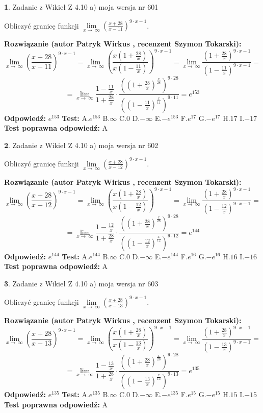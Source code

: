 \documentclass[12pt, a4paper]{article}
\theoremstyle{definition} %
\newtheorem{zad}{}
\newcommand{\zadStart}[1]{\begin{zad}#1\newline}
\newcommand{\zadStop}{\end{zad}}
\newcommand{\rozwStart}[2]{\noindent \textbf{Rozwiązanie (autor #1 , recenzent #2): }\newline}
\newcommand{\rozwStop}{\newline}
\newcommand{\odpStart}{\noindent \textbf{Odpowiedź:}\newline}
\newcommand{\odpStop}{\newline}
\newcommand{\testStart}{\noindent \textbf{Test:}\newline}
\newcommand{\testStop}{\newline}
\newcommand{\kluczStart}{\noindent \textbf{Test poprawna odpowiedź:}\newline}
\newcommand{\kluczStop}{\newline}
\begin{document}
\zadStart{Zadanie z Wikieł Z 4.10 a) moja wersja nr 601}

Obliczyć granicę funkcji  $\lim\limits_{x\to\ \infty}(\frac{x+28}{x-11})^{9\cdot x-1}$.
\zadStop
\rozwStart{Patryk Wirkus}{Szymon Tokarski}
$$\lim\limits_{x\to\ \infty}(\frac{x+28}{x-11})^{9\cdot x-1} = \lim\limits_{x\to\ \infty}(\frac{x(1+\frac{28}{x})}{x(1-\frac{11}{x})})^{9\cdot x-1}=\lim\limits_{x\to\ \infty}\frac{(1+\frac{28}{x})^{9\cdot x-1}}{(1-\frac{11}{x})^{9\cdot x-1}}=$$
$$=\lim\limits_{x\to\ \infty}\frac{1-\frac{11}{x}}{1+\frac{28}{x}}\cdot\frac{((1+\frac{28}{x})^{\frac{x}{28}})^{9\cdot28}}{((1-\frac{11}{x})^{\frac{x}{11}})^{9\cdot11}}=e^{153}$$
\rozwStop
\odpStart
$e^{153}$
\odpStop
\testStart
A.$e^{153}$ B.$\infty$ C.$0$ D.$-\infty$ E.$-e^{153}$
F.$e^{17}$ G.$-e^{17}$
H.$17$
I.$-17$
\testStop
\kluczStart
A
\kluczStop



\zadStart{Zadanie z Wikieł Z 4.10 a) moja wersja nr 602}

Obliczyć granicę funkcji  $\lim\limits_{x\to\ \infty}(\frac{x+28}{x-12})^{9\cdot x-1}$.
\zadStop
\rozwStart{Patryk Wirkus}{Szymon Tokarski}
$$\lim\limits_{x\to\ \infty}(\frac{x+28}{x-12})^{9\cdot x-1} = \lim\limits_{x\to\ \infty}(\frac{x(1+\frac{28}{x})}{x(1-\frac{12}{x})})^{9\cdot x-1}=\lim\limits_{x\to\ \infty}\frac{(1+\frac{28}{x})^{9\cdot x-1}}{(1-\frac{12}{x})^{9\cdot x-1}}=$$
$$=\lim\limits_{x\to\ \infty}\frac{1-\frac{12}{x}}{1+\frac{28}{x}}\cdot\frac{((1+\frac{28}{x})^{\frac{x}{28}})^{9\cdot28}}{((1-\frac{12}{x})^{\frac{x}{12}})^{9\cdot12}}=e^{144}$$
\rozwStop
\odpStart
$e^{144}$
\odpStop
\testStart
A.$e^{144}$ B.$\infty$ C.$0$ D.$-\infty$ E.$-e^{144}$
F.$e^{16}$ G.$-e^{16}$
H.$16$
I.$-16$
\testStop
\kluczStart
A
\kluczStop



\zadStart{Zadanie z Wikieł Z 4.10 a) moja wersja nr 603}

Obliczyć granicę funkcji  $\lim\limits_{x\to\ \infty}(\frac{x+28}{x-13})^{9\cdot x-1}$.
\zadStop
\rozwStart{Patryk Wirkus}{Szymon Tokarski}
$$\lim\limits_{x\to\ \infty}(\frac{x+28}{x-13})^{9\cdot x-1} = \lim\limits_{x\to\ \infty}(\frac{x(1+\frac{28}{x})}{x(1-\frac{13}{x})})^{9\cdot x-1}=\lim\limits_{x\to\ \infty}\frac{(1+\frac{28}{x})^{9\cdot x-1}}{(1-\frac{13}{x})^{9\cdot x-1}}=$$
$$=\lim\limits_{x\to\ \infty}\frac{1-\frac{13}{x}}{1+\frac{28}{x}}\cdot\frac{((1+\frac{28}{x})^{\frac{x}{28}})^{9\cdot28}}{((1-\frac{13}{x})^{\frac{x}{13}})^{9\cdot13}}=e^{135}$$
\rozwStop
\odpStart
$e^{135}$
\odpStop
\testStart
A.$e^{135}$ B.$\infty$ C.$0$ D.$-\infty$ E.$-e^{135}$
F.$e^{15}$ G.$-e^{15}$
H.$15$
I.$-15$
\testStop
\kluczStart
A
\kluczStop
\end{document}
